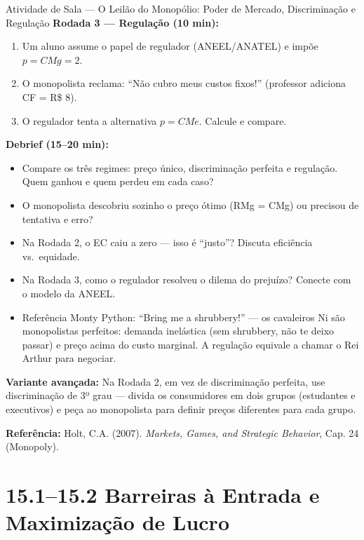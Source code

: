 \documentclass[11pt,twoside,openright]{book}
\providecommand{\tightlist}{\setlength{\itemsep}{0pt}\setlength{\parskip}{0pt}}
\begin{document}
\begin{classroombox}{Atividade de Sala — O Leilão do Monopólio: Poder de Mercado, Discriminação e Regulação}
\textbf{Rodada 3 --- Regulação (10 min):}

\begin{enumerate}
\def\labelenumi{\arabic{enumi}.}
\tightlist
\item
  Um aluno assume o papel de regulador (ANEEL/ANATEL) e impõe
  \(p = CMg = 2\).
\item
  O monopolista reclama: ``Não cubro meus custos fixos!'' (professor
  adiciona CF = R\$ 8).
\item
  O regulador tenta a alternativa \(p = CMe\). Calcule e compare.
\end{enumerate}

\textbf{Debrief (15--20 min):}

\begin{itemize}
\tightlist
\item
  Compare os três regimes: preço único, discriminação perfeita e
  regulação. Quem ganhou e quem perdeu em cada caso?
\item
  O monopolista descobriu sozinho o preço ótimo (RMg = CMg) ou precisou
  de tentativa e erro?
\item
  Na Rodada 2, o EC caiu a zero --- isso é ``justo''? Discuta eficiência
  vs.~equidade.
\item
  Na Rodada 3, como o regulador resolveu o dilema do prejuízo? Conecte
  com o modelo da ANEEL.
\item
  Referência Monty Python: ``Bring me a shrubbery!'' --- os cavaleiros
  Ni são monopolistas perfeitos: demanda inelástica (sem shrubbery, não
  te deixo passar) e preço acima do custo marginal. A regulação equivale
  a chamar o Rei Arthur para negociar.
\end{itemize}

\textbf{Variante avançada:} Na Rodada 2, em vez de discriminação
perfeita, use discriminação de 3º grau --- divida os consumidores em
dois grupos (estudantes e executivos) e peça ao monopolista para definir
preços diferentes para cada grupo.

\textbf{Referência:} Holt, C.A. (2007). \emph{Markets, Games, and
Strategic Behavior}, Cap. 24 (Monopoly).

\end{classroombox}

\chapter{15.1--15.2 Barreiras à Entrada e Maximização de
Lucro}\label{barreiras-uxe0-entrada-e-maximizauxe7uxe3o-de-lucro}
\end{document}
